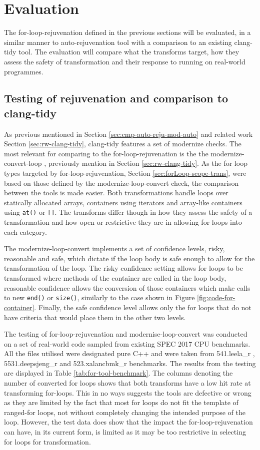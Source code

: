\documentclass[bsc,frontabs,singlespacing,twoside,parskip,deptreport]{infthesis}
\begin{document}
\section{Evaluation}
The for-loop-rejuvenation defined in the previous sections will be evaluated, in a similar manner to auto-rejuvenation tool with a comparison to an existing clang-tidy tool. The evaluation will compare what the transforms target, how they assess the safety of transformation and their response to running on real-world programmes.   

\subsection{Testing of rejuvenation and comparison to clang-tidy}
As previous mentioned in Section \ref{sec:cmp-auto-reju-mod-auto} and related work Section \ref{sec:rw-clang-tidy}, clang-tidy features a set of modernize checks. The most relevant for comparing to the for-loop-rejuvenation is the the modernize-convert-loop \cite{FOR_CONVERT}, previously mention in Section \ref{sec:rw-clang-tidy}. As the for loop types targeted by for-loop-rejuvenation, Section \ref{sec:forLoop-scope-trans}, were based on those defined by the modernize-loop-convert check, the comparison between the tools is made easier. Both transformations handle loops over statically allocated arrays, containers using iterators and array-like containers using \texttt{at()} or \texttt{[]}. The transforms differ though in how they assess the safety of a transformation and how open or restrictive they are in allowing for-loops into each category. 

The modernize-loop-convert implements a set of confidence levels, risky, reasonable and safe, which dictate if the loop body is safe enough to allow for the transformation of the loop. The risky confidence setting allows for loops to be transformed where methods of the container are called in the loop body, reasonable confidence allows the conversion of those containers which make calls to new \texttt{end()} or \texttt{size()}, similarly to the case shown in Figure \ref{fig:code-for-container}. Finally, the safe confidence level allows only the for loops that do not have criteria that would place them in the other two levels.

The testing of for-loop-rejuvenation and modernise-loop-convert was conducted on a set of real-world code sampled from existing SPEC 2017 CPU benchmarks. All the files utilised were designated pure C++ and were taken from 541.leela\_r \cite{SPEC_LEELA}, 5531.deepsjeng\_r \cite{SPEC_DEEPSJENG} and 523.xalancbmk\_r \cite{SPEC_XALANCBMK} benchmarks. The results from the testing are displayed in Table \ref{tab:for-tool-benchmark}. The columns denoting the number of converted for loops shows that both transforms have a low hit rate at transforming for-loops. This in no ways suggests the tools are defective or wrong as they are limited by the fact that most for loops do not fit the template of ranged-for loops, not without completely changing the intended purpose of the loop. However, the test data does show that the impact the for-loop-rejuvenation can have, in its current form, is limited as it may be too restrictive in selecting for loops for transformation.
\end{document}
